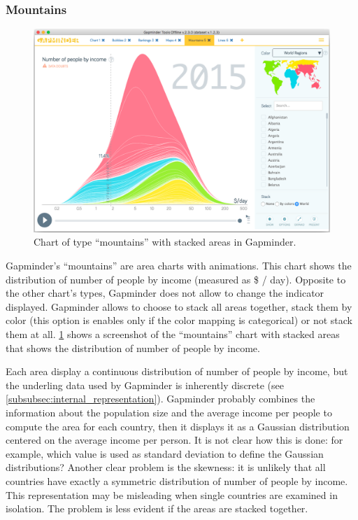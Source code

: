 \subsubsection{Mountains}
\label{subsubsec:mountains}
\begin{figure}[h]
	\centering
	\includegraphics[width=0.95\columnwidth]{figures/mountains}
	\caption{Chart of type ``mountains'' with stacked areas in Gapminder.}
	\label{fig:mountains}
\end{figure}

Gapminder's ``mountains'' are area charts with animations.
This chart shows the distribution of number of people by income (measured as \$ / day).
Opposite to the other chart's types, Gapminder does not allow to change the indicator displayed.
Gapminder allows to choose to stack all areas together, stack them by color (this option is enables only if the color mapping is categorical) or not stack them at all.
\cref{fig:mountains} shows a screenshot of the ``mountains'' chart with stacked areas that shows the distribution of number of people by income.

Each area display a continuous distribution of number of people by income, but the underling data used by Gapminder is inherently discrete (see \cref{subsubsec:internal_representation}).
Gapminder probably combines the information about the population size and the average income per people to compute the area for each country, then it displays it as a Gaussian distribution centered on the average income per person.
It is not clear how this is done:
for example, which value is used as standard deviation to define the Gaussian distributions?
Another clear problem is the skewness:
it is unlikely that all countries have exactly a symmetric distribution of number of people by income.
This representation may be misleading when single countries are examined in isolation.
The problem is less evident if the areas are stacked together.

